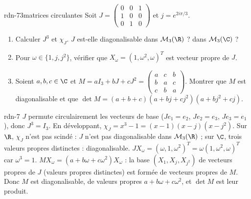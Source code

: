\begin{exo}{rdn-7}{3}{matrices circulantes}
Soit $J=\begin{pmatrix}0&0&1\\1&0&0\\0&1&0\end{pmatrix}$ et $j=e^{2i\pi/3}$.
\begin{enumerate}
\item Calculer $J^3$ et $\chi_J$. $J$ est-elle diagonalisable dans $\mathcal M_3(\R)$ ? dans $\mathcal M_3(\C)$ ?
\item Pour $\omega\in\{1,j,j^2\}$, vérifier que $X_\omega=(1,\omega^2,\omega)^T$ est vecteur propre de $J$.
\item Soient $a,b,c\in\C$ et $M=aI_3+bJ+cJ^2=\begin{pmatrix}a&c&b\\b&a&c\\c&b&a\end{pmatrix}$. Montrer que $M$ est diagonalisable et
que $\det M=(a+b+c)(a+bj+cj^2)(a+bj^2+cj)$.
\end{enumerate}
\end{exo}
\begin{corrige}{rdn-7}
 $J$ permute circulairement les vecteurs de base ($Je_1=e_2$, $Je_2=e_3$, $Je_3=e_1$), donc $J^3=I_3$. En développant,
$\chi_J=x^3-1=(x-1)(x-j)(x-j^2)$. Sur $\R$, $\chi_J$ n'est pas scindé : $J$ n'est pas diagonalisable dans $\mathcal M_3(\R)$ ; sur $\C$,
trois valeurs propres distinctes : diagonalisable.
 $JX_\omega=(\omega,1,\omega^2)^T=\omega(1,\omega^2,\omega)^T$ car $\omega^3=1$.
 $MX_\omega=(a+b\omega+c\omega^2)X_\omega$ : la base $(X_1,X_j,X_{j^2})$ de vecteurs propres de $J$ (valeurs propres distinctes)
est formée de vecteurs propres de $M$. Donc $M$ est diagonalisable, de valeurs propres $a+b\omega+c\omega^2$, et $\det M$ est leur produit.
\end{corrige}

